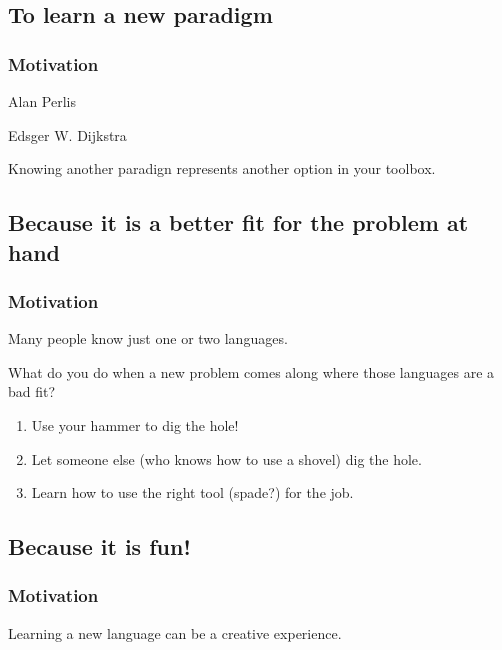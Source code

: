 {\subsection{To learn a new paradigm}
\begin{frame}
    \frametitle{Motivation }
    \pause
    \vspace{3mm}
    \begin{inspiration}{Alan Perlis}
      \textcolor{purple}{\textsl{}}
    \end{inspiration}
    
    \pause
    \vspace{5mm}
    \begin{inspiration}{Edsger W. Dijkstra}
      \textcolor{purple}{\textsl{}}
    \end{inspiration}
    
    \pause
    \vspace{5mm}
    Knowing another paradign represents another option in your toolbox.
\end{frame}

\subsection{Because it is a better fit for the problem at hand}
\begin{frame}
    \frametitle{Motivation }
    \vspace{3mm}
    Many people know just one or two languages.
    
    \pause
    \vspace{5mm}
    What do you do when a new problem comes along where those languages are a bad fit?
    \begin{enumerate}
      \item Use your hammer to dig the hole!
      \item Let someone else (who knows how to use a shovel) dig the hole.
      \item Learn how to use the right tool (spade?) for the job.
    \end{enumerate}
\end{frame}

\subsection{Because it is fun!}
\begin{frame}
    \frametitle{Motivation }
    \vspace{3mm}
    Learning a new language can be a creative experience.
    

\end{frame}}
